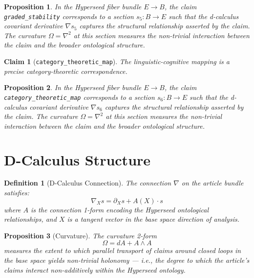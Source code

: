\documentclass{article}
\newtheorem{claim}{Claim}
\newtheorem{definition}{Definition}
\newtheorem{proposition}{Proposition}
\begin{document}
\begin{proposition}
In the Hyperseed fiber bundle $E \to B$, the claim \texttt{graded_stability} corresponds to a section $s_5: B \to E$ such that the d-calculus covariant derivative $\nabla s_5$ captures the structural relationship asserted by the claim. The curvature $\Omega = \nabla^2$ at this section measures the non-trivial interaction between the claim and the broader ontological structure.
\end{proposition}

\begin{claim}[\texttt{category_theoretic_map}]
The linguistic-cognitive mapping is a precise category-theoretic correspondence.
\end{claim}

\begin{proposition}
In the Hyperseed fiber bundle $E \to B$, the claim \texttt{category_theoretic_map} corresponds to a section $s_6: B \to E$ such that the d-calculus covariant derivative $\nabla s_6$ captures the structural relationship asserted by the claim. The curvature $\Omega = \nabla^2$ at this section measures the non-trivial interaction between the claim and the broader ontological structure.
\end{proposition}

\section{D-Calculus Structure}

\begin{definition}[D-Calculus Connection]
The connection $\nabla$ on the article bundle satisfies:
\begin{equation}
  \nabla_X s = \partial_X s + A(X) \cdot s
\end{equation}
where $A$ is the connection 1-form encoding the Hyperseed ontological relationships, and $X$ is a tangent vector in the base space direction of analysis.
\end{definition}

\begin{proposition}[Curvature]
The curvature 2-form
\begin{equation}
  \Omega = dA + A \wedge A
\end{equation}
measures the extent to which parallel transport of claims around closed loops in the base space yields non-trivial holonomy --- i.e., the degree to which the article's claims interact non-additively within the Hyperseed ontology.
\end{proposition}
\end{document}
